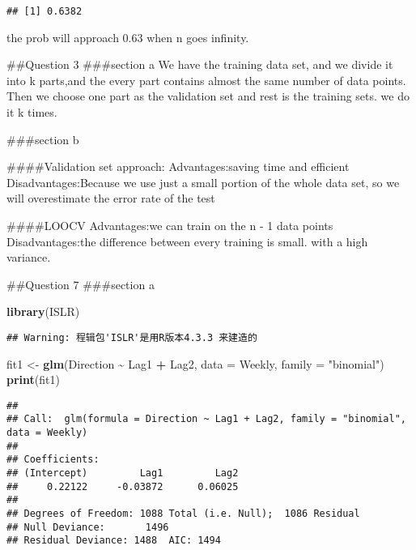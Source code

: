\documentclass[
]{article}
\newenvironment{Shaded}{\begin{snugshade}}{\end{snugshade}}
\newcommand{\AttributeTok}[1]{\textcolor[rgb]{0.13,0.29,0.53}{#1}}
\newcommand{\FunctionTok}[1]{\textcolor[rgb]{0.13,0.29,0.53}{\textbf{#1}}}
\newcommand{\NormalTok}[1]{#1}
\newcommand{\OtherTok}[1]{\textcolor[rgb]{0.56,0.35,0.01}{#1}}
\newcommand{\SpecialCharTok}[1]{\textcolor[rgb]{0.81,0.36,0.00}{\textbf{#1}}}
\newcommand{\StringTok}[1]{\textcolor[rgb]{0.31,0.60,0.02}{#1}}
\begin{document}
\begin{verbatim}
## [1] 0.6382
\end{verbatim}

the prob will approach 0.63 when n goes infinity.

\#\#Question 3 \#\#\#section a We have the training data set, and we
divide it into k parts,and the every part contains almost the same
number of data points. Then we choose one part as the validation set and
rest is the training sets. we do it k times.

\#\#\#section b

\#\#\#\#Validation set approach: Advantages:saving time and efficient
Disadvantages:Because we use just a small portion of the whole data set,
so we will overestimate the error rate of the test

\#\#\#\#LOOCV Advantages:we can train on the n - 1 data points
Disadvantages:the difference between every training is small. with a
high variance.

\#\#Question 7 \#\#\#section a

\begin{Shaded}
\begin{Highlighting}[]
\FunctionTok{library}\NormalTok{(ISLR)}
\end{Highlighting}
\end{Shaded}

\begin{verbatim}
## Warning: 程辑包'ISLR'是用R版本4.3.3 来建造的
\end{verbatim}

\begin{Shaded}
\begin{Highlighting}[]
\NormalTok{fit1 }\OtherTok{\textless{}{-}} \FunctionTok{glm}\NormalTok{(Direction }\SpecialCharTok{\textasciitilde{}}\NormalTok{ Lag1 }\SpecialCharTok{+}\NormalTok{ Lag2, }\AttributeTok{data =}\NormalTok{ Weekly, }\AttributeTok{family =} \StringTok{"binomial"}\NormalTok{)}
\FunctionTok{print}\NormalTok{(fit1)}
\end{Highlighting}
\end{Shaded}

\begin{verbatim}
## 
## Call:  glm(formula = Direction ~ Lag1 + Lag2, family = "binomial", data = Weekly)
## 
## Coefficients:
## (Intercept)         Lag1         Lag2  
##     0.22122     -0.03872      0.06025  
## 
## Degrees of Freedom: 1088 Total (i.e. Null);  1086 Residual
## Null Deviance:       1496 
## Residual Deviance: 1488  AIC: 1494
\end{verbatim}
\end{document}
